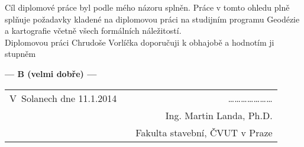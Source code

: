 \documentclass[czech,11pt,a4paper]{article}
\begin{document}
Cíl diplomové práce byl podle mého názoru splněn. Práce v tomto ohledu
plně splňuje požadavky kladené na diplomovou práci na studijním
programu Geodézie a kartografie včetně všech formálních náležitostí.
\\

Diplomovou práci Chrudoše Vorlíčka doporučuji k obhajobě a hodnotím ji
stu\-pněm

\begin{center}
{\bf --- B (velmi dobře)  ---}
\end{center}

\vspace{1.2cm}

\noindent \begin{tabular}{lp{}r}
V~Solanech dne 11.1.2014 & & \ldots\ldots\ldots\ldots\ldots\ldots\ldots \\
& & Ing. Martin Landa, Ph.D. \\
& & Fakulta stavební, ČVUT v Praze \\
\end{tabular}
\end{document}
